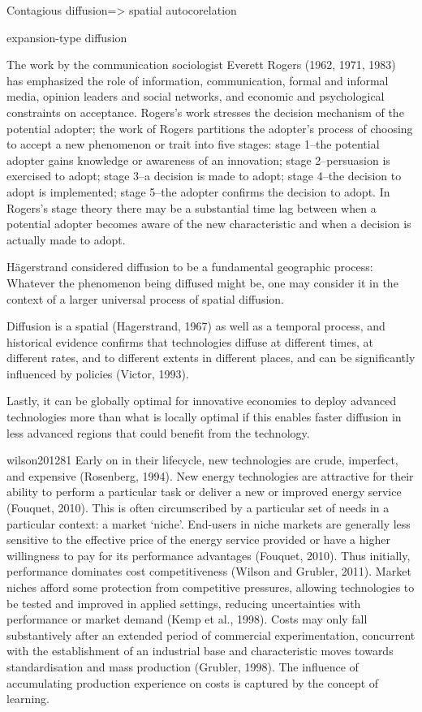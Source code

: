 \documentclass[preprint, 3p,
authoryear]{elsarticle} %
\begin{document}
Contagious diffusion=\textgreater{} spatial autocorelation

expansion-type diffusion

The work by the communication sociologist Everett Rogers (1962, 1971,
1983) has emphasized the role of information, communication, formal and
informal media, opinion leaders and social networks, and economic and
psychological constraints on acceptance. Rogers's work stresses the
decision mechanism of the potential adopter; the work of Rogers
partitions the adopter's process of choosing to accept a new phenomenon
or trait into five stages: stage 1--the potential adopter gains
knowledge or awareness of an innovation; stage 2--persuasion is
exercised to adopt; stage 3--a decision is made to adopt; stage 4--the
decision to adopt is implemented; stage 5--the adopter confirms the
decision to adopt. In Rogers's stage theory there may be a substantial
time lag between when a potential adopter becomes aware of the new
characteristic and when a decision is actually made to adopt.

Hägerstrand considered diffusion to be a fundamental geographic process:
Whatever the phenomenon being diffused might be, one may consider it in
the context of a larger universal process of spatial diffusion.

\citet{leibowicz2016representing} Diffusion is a spatial (Hagerstrand,
1967) as well as a temporal process, and historical evidence confirms
that technologies diffuse at different times, at different rates, and to
different extents in different places, and can be significantly
influenced by policies (Victor, 1993).

Lastly, it can be globally optimal for innovative economies to deploy
advanced technologies more than what is locally optimal if this enables
faster diffusion in less advanced regions that could benefit from the
technology.

wilson201281 Early on in their lifecycle, new technologies are crude,
imperfect, and expensive (Rosenberg, 1994). New energy technologies are
attractive for their ability to perform a particular task or deliver a
new or improved energy service (Fouquet, 2010). This is often
circumscribed by a particular set of needs in a particular context: a
market `niche'. End-users in niche markets are generally less sensitive
to the effective price of the energy service provided or have a higher
willingness to pay for its performance advantages (Fouquet, 2010). Thus
initially, performance dominates cost competitiveness (Wilson and
Grubler, 2011). Market niches afford some protection from competitive
pressures, allowing technologies to be tested and improved in applied
settings, reducing uncertainties with performance or market demand (Kemp
et al., 1998). Costs may only fall substantively after an extended
period of commercial experimentation, concurrent with the establishment
of an industrial base and characteristic moves towards standardisation
and mass production (Grubler, 1998). The influence of accumulating
production experience on costs is captured by the concept of learning.
\end{document}
